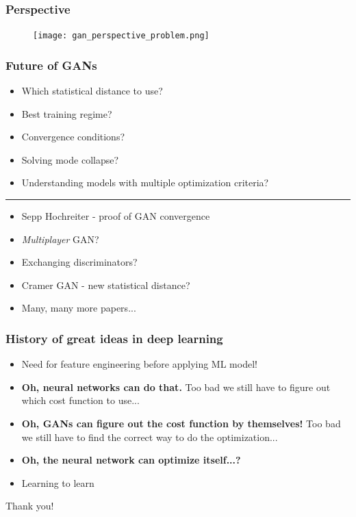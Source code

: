 \documentclass{Bredelebeamer}
\begin{document}
\begin{frame} \frametitle{Perspective}
	\begin{figure}[h!]
	\centering
	\texttt{[image: gan\_perspective\_problem.png]}
	\end{figure}
\end{frame}

\begin{frame}
	\frametitle{Future of GANs}
	\begin{itemize}[<+->]
		\item Which statistical distance to use?
		\item Best training regime?
		\item Convergence conditions?
		\item Solving mode collapse?
		\item Understanding models with multiple optimization criteria?
	\end{itemize}

	\pause[6]
	\noindent\rule{8cm}{0.4pt}
	\begin{itemize}[<+->]
		\item Sepp Hochreiter - proof of GAN convergence
		\item \textit{Multiplayer} GAN? 
		\item Exchanging discriminators?
		\item Cramer GAN - new statistical distance?
		\item Many, many more papers...
	\end{itemize}
\end{frame}
\begin{frame}
\frametitle{History of great ideas in deep learning}

\begin{itemize}[<+(1)->]

	\item Need for feature engineering before applying ML model!
	\item \textbf{Oh, neural networks can do that.} Too bad we still have to figure out which cost function to use...
	\item \textbf{Oh, GANs can figure out the cost function by themselves!} Too bad we still have to find the correct way to do the optimization...
	\item \textbf{Oh, the neural network can optimize itself...?}
	\item Learning to learn 
\end{itemize}

\end{frame}


\begin{frame}
\Huge{\centerline{Thank you!}}
\end{frame}

\end{document}
